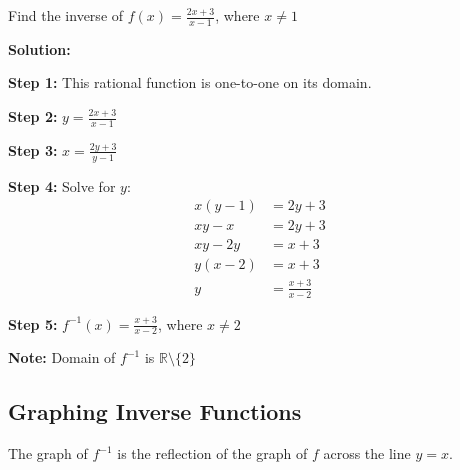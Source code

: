 \documentclass[12pt,a4paper]{article}
\begin{document}
\begin{example}
Find the inverse of $f(x) = \frac{2x + 3}{x - 1}$, where $x \neq 1$

\textbf{Solution:}

\textbf{Step 1:} This rational function is one-to-one on its domain.

\textbf{Step 2:} $y = \frac{2x + 3}{x - 1}$

\textbf{Step 3:} $x = \frac{2y + 3}{y - 1}$

\textbf{Step 4:} Solve for $y$:
\begin{align*}
x(y - 1) &= 2y + 3 \\
xy - x &= 2y + 3 \\
xy - 2y &= x + 3 \\
y(x - 2) &= x + 3 \\
y &= \frac{x + 3}{x - 2}
\end{align*}

\textbf{Step 5:} $f^{-1}(x) = \frac{x + 3}{x - 2}$, where $x \neq 2$

\textbf{Note:} Domain of $f^{-1}$ is $\mathbb{R} \setminus \{2\}$
\end{example}

\subsection{Graphing Inverse Functions}

\begin{theorem}
The graph of $f^{-1}$ is the reflection of the graph of $f$ across the line $y = x$.
\end{theorem}

\begin{center}
\end{center}
\end{document}
